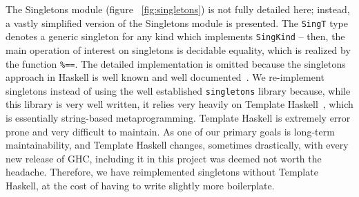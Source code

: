                        The Singletons module (figure ~\ref{fig:singletons}) is 
                        not fully detailed here;
                        instead, a vastly simplified version of the Singletons 
                        module is presented. The
                        \lstinline{SingT} type denotes a generic singleton for 
                        any kind which implements
                        \lstinline{SingKind} -- then, the main operation of 
                        interest on singletons is
                        decidable equality, which is realized by the function 
                        \lstinline{%==}. The
                            detailed implementation is omitted because the 
                            singletons approach in Haskell
                            is well known and well 
                            documented~\cite{singletons}. We re-implement
                            singletons instead of using the well established 
                            \texttt{singletons} library
                            because, while this library is very well written, 
                            it relies very heavily on
                            Template Haskell~\cite{th}, which is essentially 
                            string-based
                            metaprogramming. Template Haskell is extremely 
                            error prone and very difficult
                            to maintain. As one of our primary goals is 
                            long-term maintainability, and
                            Template Haskell changes, sometimes drastically, 
                            with every new release of
                            GHC, including it in this project was deemed not 
                            worth the
                            headache. Therefore, we have reimplemented 
                            singletons without Template
                            Haskell, at the cost of having to write slightly 
                            more boilerplate.
                            
                            

 
